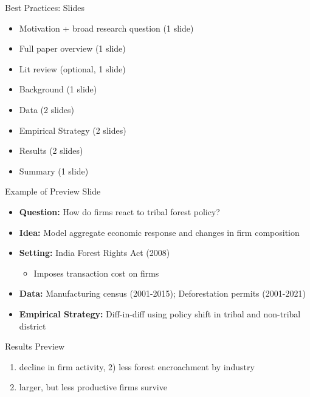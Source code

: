 \documentclass[
  ignorenonframetext,
  aspectratio=169]{beamer}
\providecommand{\tightlist}{%
  \setlength{\itemsep}{0pt}\setlength{\parskip}{0pt}}
\begin{document}
\begin{frame}{Best Practices: Slides}
\protect\hypertarget{best-practices-slides}{}
\begin{itemize}
\item
  Motivation + broad research question (1 slide)
\item
  Full paper overview (1 slide)
\item
  Lit review (optional, 1 slide)
\item
  Background (1 slide)
\item
  Data (2 slides)
\item
  Empirical Strategy (2 slides)
\item
  Results (2 slides)
\item
  Summary (1 slide)
\end{itemize}
\end{frame}

\begin{frame}{Example of Preview Slide}
\protect\hypertarget{example-of-preview-slide}{}
\begin{itemize}
\item
  \textbf{Question:} How do firms react to tribal forest policy?
\item
  \textbf{Idea:} Model aggregate economic response and changes in firm
  composition
\item
  \textbf{Setting:} India Forest Rights Act (2008)

  \begin{itemize}
  \tightlist
  \item
    Imposes transaction cost on firms
  \end{itemize}
\item
  \textbf{Data:} Manufacturing census (2001-2015); Deforestation permits
  (2001-2021)
\item
  \textbf{Empirical Strategy:} Diff-in-diff using policy shift in tribal
  and non-tribal district
\end{itemize}

\vfill

\begin{block}{Results Preview}
\protect\hypertarget{results-preview}{}
\begin{enumerate}
[1)]
\tightlist
\item
  decline in firm activity, 2) less forest encroachment by industry\\
\item
  larger, but less productive firms survive
\end{enumerate}
\end{block}
\end{frame}
\end{document}
